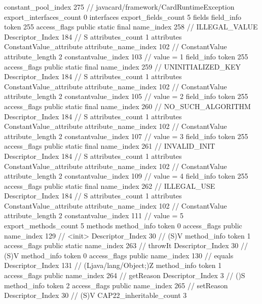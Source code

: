 {{{{				constant_pool_index	275		// javacard/framework/CardRuntimeException
			}
			export_interfaces_count	0
			interfaces {
			}
			export_fields_count	5
			fields {
			field_info {
				token	255
				access_flags	public static final
				name_index	258		// ILLEGAL_VALUE
				Descriptor_Index	184		// S
				attributes_count	1
				attributes {
				ConstantValue_attribute {
					attribute_name_index	102		// ConstantValue
					attribute_length	2
					constantvalue_index	103		// value = 1
				}
				}
			}
			field_info {
				token	255
				access_flags	public static final
				name_index	259		// UNINITIALIZED_KEY
				Descriptor_Index	184		// S
				attributes_count	1
				attributes {
				ConstantValue_attribute {
					attribute_name_index	102		// ConstantValue
					attribute_length	2
					constantvalue_index	105		// value = 2
				}
				}
			}
			field_info {
				token	255
				access_flags	public static final
				name_index	260		// NO_SUCH_ALGORITHM
				Descriptor_Index	184		// S
				attributes_count	1
				attributes {
				ConstantValue_attribute {
					attribute_name_index	102		// ConstantValue
					attribute_length	2
					constantvalue_index	107		// value = 3
				}
				}
			}
			field_info {
				token	255
				access_flags	public static final
				name_index	261		// INVALID_INIT
				Descriptor_Index	184		// S
				attributes_count	1
				attributes {
				ConstantValue_attribute {
					attribute_name_index	102		// ConstantValue
					attribute_length	2
					constantvalue_index	109		// value = 4
				}
				}
			}
			field_info {
				token	255
				access_flags	public static final
				name_index	262		// ILLEGAL_USE
				Descriptor_Index	184		// S
				attributes_count	1
				attributes {
				ConstantValue_attribute {
					attribute_name_index	102		// ConstantValue
					attribute_length	2
					constantvalue_index	111		// value = 5
				}
				}
			}
			}
			export_methods_count	5
			methods {
				method_info {
					token	0
					access_flags	public
					name_index	129		// <init>
					Descriptor_Index	30		// (S)V
				}
				method_info {
					token	1
					access_flags	public static
					name_index	263		// throwIt
					Descriptor_Index	30		// (S)V
				}
				method_info {
					token	0
					access_flags	public
					name_index	130		// equals
					Descriptor_Index	131		// (Ljava/lang/Object;)Z
				}
				method_info {
					token	1
					access_flags	public
					name_index	264		// getReason
					Descriptor_Index	3		// ()S
				}
				method_info {
					token	2
					access_flags	public
					name_index	265		// setReason
					Descriptor_Index	30		// (S)V
				}
			}
			CAP22_inheritable_count	3
		}
}}
